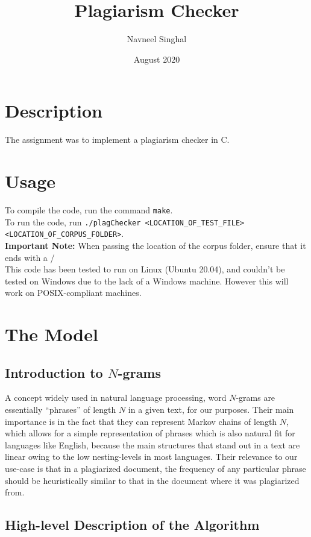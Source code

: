 \documentclass{article}
\title{\fontfamily{cmss}\selectfont Plagiarism Checker}
\author{Navneel Singhal}
\date{August 2020}
\begin{document}
\maketitle

\section*{Description}

The assignment was to implement a plagiarism checker in C.

\section*{Usage}

To compile the code, run the command \texttt{make}. \\
To run the code, run \texttt{./plagChecker <LOCATION\_OF\_TEST\_FILE> <LOCATION\_OF\_CORPUS\_FOLDER>}.
\\
\textbf{Important Note:} When passing the location of the corpus folder, ensure that it ends with a /
\\
This code has been tested to run on Linux (Ubuntu 20.04), and couldn't be tested on Windows due to the lack of a Windows machine. However this will work on POSIX-compliant machines.

\section*{The Model}

\subsection*{Introduction to $N$-grams}
A concept widely used in natural language processing, word $N$-grams are essentially ``phrases'' of length $N$ in a given text, for our purposes. 
Their main importance is in the fact that they can represent Markov chains of length $N$, which allows for a simple representation of phrases which is also natural fit for languages like English, because the main structures that stand out in a text are linear owing to the low nesting-levels in most languages.
Their relevance to our use-case is that in a plagiarized document, the frequency of any particular phrase should be heuristically similar to that in the document where it was plagiarized from.

\subsection*{High-level Description of the Algorithm}
\end{document}
